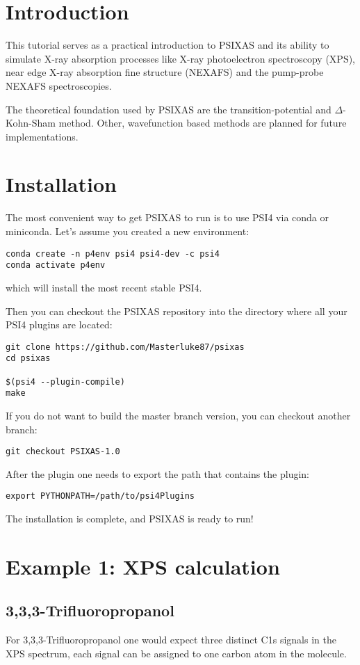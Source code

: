 \documentclass[11pt]{article}
\author{Christopher Ehlert}
\date{\today}
\title{}
\begin{document}
\tableofcontents


\section{Introduction}
\label{sec:org4c9492c}
This tutorial serves as a practical introduction to PSIXAS and its ability to simulate 
X-ray absorption processes like X-ray photoelectron spectroscopy (XPS), 
near edge X-ray absorption fine structure (NEXAFS) and the pump-probe NEXAFS spectroscopies.

The theoretical foundation used by PSIXAS are the 
transition-potential and \(\Delta\)-Kohn-Sham method. Other, wavefunction based methods 
are planned for future implementations.


\section{Installation}
\label{sec:orge19c54b}
The most convenient way to get PSIXAS to run is to use PSI4 via 
conda or miniconda. Let's assume you created a new environment:

\begin{verbatim}
conda create -n p4env psi4 psi4-dev -c psi4
conda activate p4env
\end{verbatim}
which will install the most recent stable PSI4.

Then you can checkout the PSIXAS repository into the directory where all your PSI4
plugins are located:
\begin{verbatim}
git clone https://github.com/Masterluke87/psixas
cd psixas

$(psi4 --plugin-compile)
make
\end{verbatim}
If you do not want to build the master branch version, you can checkout
 another branch:
\begin{verbatim}
git checkout PSIXAS-1.0
\end{verbatim}

After the plugin one needs to export the path that contains the plugin:
\begin{verbatim}
export PYTHONPATH=/path/to/psi4Plugins
\end{verbatim}
The installation is complete, and PSIXAS is ready to run!

\section{Example 1: XPS calculation}
\label{sec:orgaa672c1}
\subsection{3,3,3-Trifluoropropanol}
\label{sec:orge2d5d52}
For 3,3,3-Trifluoropropanol one would expect three distinct C1s signals in the XPS spectrum, each signal can be assigned 
to one carbon atom in the molecule.
\end{document}
